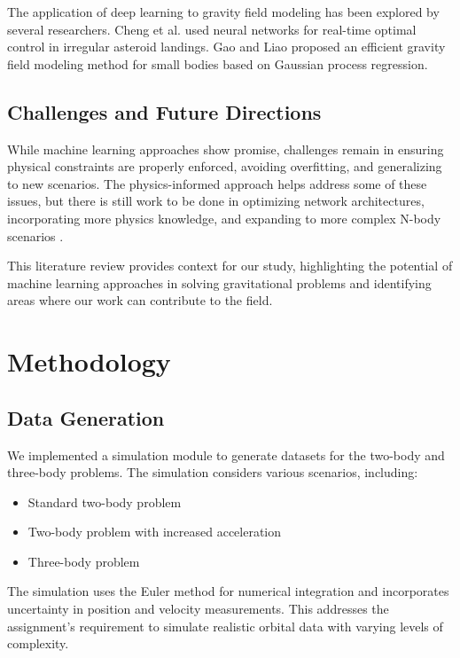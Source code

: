 \documentclass[12pt,a4paper]{article}
\begin{document}
The application of deep learning to gravity field modeling has been explored by several researchers. Cheng et al. \cite{cheng2020} used neural networks for real-time optimal control in irregular asteroid landings. Gao and Liao \cite{gao2019} proposed an efficient gravity field modeling method for small bodies based on Gaussian process regression.

\subsection{Challenges and Future Directions}

While machine learning approaches show promise, challenges remain in ensuring physical constraints are properly enforced, avoiding overfitting, and generalizing to new scenarios. The physics-informed approach helps address some of these issues, but there is still work to be done in optimizing network architectures, incorporating more physics knowledge, and expanding to more complex N-body scenarios \cite{martin2022physics}.

This literature review provides context for our study, highlighting the potential of machine learning approaches in solving gravitational problems and identifying areas where our work can contribute to the field.

\section{Methodology}
\label{sec:methodology}

\subsection{Data Generation}
We implemented a simulation module to generate datasets for the two-body and three-body problems. The simulation considers various scenarios, including:

\begin{itemize}
    \item Standard two-body problem
    \item Two-body problem with increased acceleration
    \item Three-body problem
\end{itemize}

The simulation uses the Euler method for numerical integration and incorporates uncertainty in position and velocity measurements. This addresses the assignment's requirement to simulate realistic orbital data with varying levels of complexity.
\end{document}
